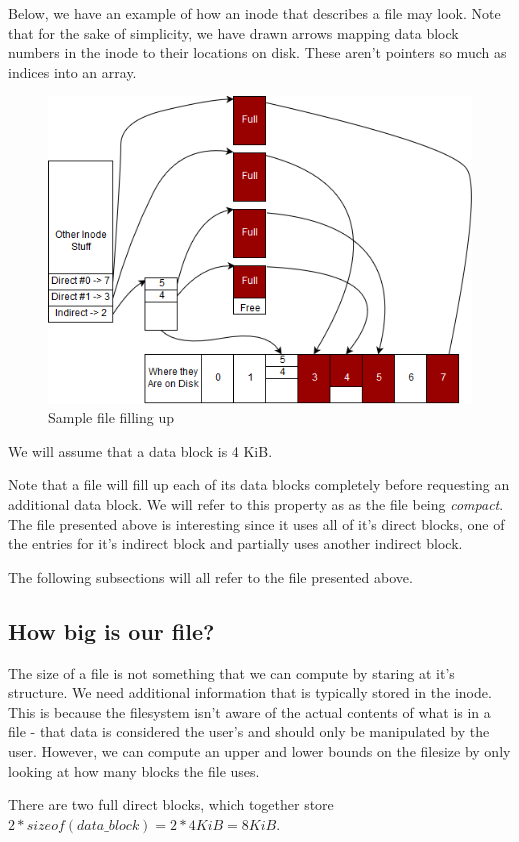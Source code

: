 Below, we have an example of how an inode that describes a file may look.
Note that for the sake of simplicity, we have drawn arrows mapping data block numbers in the inode to their locations on disk.
These aren't pointers so much as indices into an array.
\begin{figure}[htbp]
\centering
\includegraphics[width=.8\textwidth]{filesystems/images/sample_file.png}
\caption{Sample file filling up}
\end{figure}

We will assume that a data block is 4 KiB.

Note that a file will fill up each of its data blocks completely before requesting an additional data block.
We will refer to this property as as the file being \textit{compact}.
The file presented above is interesting since it uses all of it's direct blocks, one of the entries for it's indirect block and partially uses another indirect block.

The following subsections will all refer to the file presented above.

\subsection{How big is our file?}
The size of a file is not something that we can compute by staring at it's structure.
We need additional information that is typically stored in the inode.
This is because the filesystem isn't aware of the actual contents of what is in a file - that data is considered the user's and should only be manipulated by the user.
However, we can compute an upper and lower bounds on the filesize by only looking at how many blocks the file uses.

There are two full direct blocks, which together store $2*sizeof(data\_block)=2*4KiB=8KiB$.

